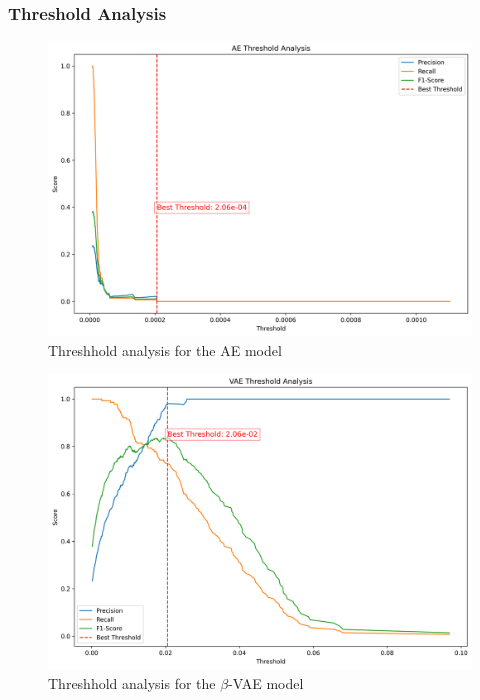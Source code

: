 \subsubsection{Threshold Analysis}

\begin{figure}[!h]
  \centering
  \includegraphics[scale=0.5]{figures/anomalies/ae/threshold.png}
  \caption{Threshhold analysis for the AE model}
  \label{fig:threshold_ae}
\end{figure}

\begin{figure}[!h]
  \centering
  \includegraphics[scale=0.5]{figures/anomalies/vae/threshold.png}
  \caption{Threshhold analysis for the $\beta$-VAE model}
  \label{fig:threshold_vae}
\end{figure}

